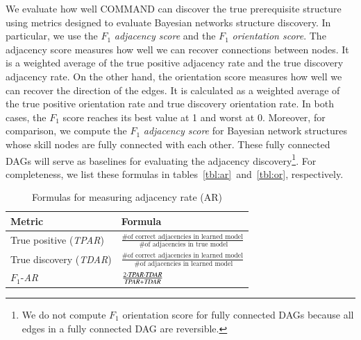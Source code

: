 \documentclass{edm_template}
\begin{document}
	
	We evaluate how well COMMAND can discover the true prerequisite structure using metrics designed to evaluate Bayesian networks structure discovery.
	In particular, we use the $F_1$ \emph{adjacency score} and the $F_1$ \emph{orientation score}.
	The adjacency score measures how well we can recover connections between nodes.
	It is a weighted average of the true positive adjacency rate and the true discovery adjacency rate.
	On the other hand, the orientation score measures how well we can recover the direction of the edges.
	It is calculated as a weighted average of the true positive orientation rate and true discovery orientation rate.
	In both cases, the $F_1$ score reaches its best value at 1 and worst at 0. 
	Moreover, for comparison, we compute the $F_1$ \emph{adjacency score} for Bayesian network structures whose skill nodes are fully connected with each other. 
	These fully connected DAGs will serve as baselines for evaluating the adjacency discovery\footnote{We do not compute $F_1$ orientation score for fully connected DAGs because all edges in a fully connected DAG are reversible.}.
	For completeness, we list these formulas in tables~\ref{tbl:ar}~and~\ref{tbl:or}, respectively.
	
	
	\begin{table}[ht]
		\centering
		\caption{Formulas for measuring adjacency rate (AR) \label{tbl:ar}}
		\label{my-label}
		\begin{tabular}{@{}ll@{}}
			\toprule
			Metric & Formula \\ \midrule
			True positive    (\emph{TPAR}) & $\frac{ \text{\# of correct adjacencies in learned model} } { \text{ \# of adjacencies in true model} }$  \\
			True discovery (\emph{TDAR}) &  $\frac{ \text{\# of correct adjacencies in learned model} } { \text{ \# of adjacencies in learned model} }$ \\
			$F_1$-\textit{AR} &  $\frac{2\cdot \text{\emph{TPAR}} \cdot \text{\emph{TDAR}}} {\text{\emph{TPAR}}+\text{\emph{TDAR}}}$  \\
			\bottomrule
		\end{tabular}
	\end{table}
	
\end{document}
